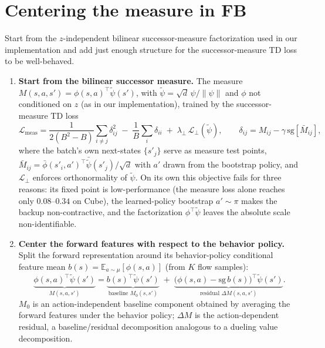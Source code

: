 \documentclass[11pt]{article}
\newcommand{\E}{\mathbb{E}}
\newcommand{\sg}{\mathrm{sg}}
\begin{document}
\section{Centering the measure in FB}
\label{sec:centered}

Start from the $z$-independent bilinear successor-measure factorization used in our implementation and add just enough structure for the successor-measure TD loss to be well-behaved.

\begin{enumerate}
    \item \textbf{Start from the bilinear successor measure.}
    The measure $M(s,a,s')=\phi(s,a)^\top\tilde\psi(s')$, with $\tilde\psi=\sqrt d\,\psi/\|\psi\|$ and $\phi$ not conditioned on $z$ (as in our implementation), trained by the successor-measure TD loss
    \begin{equation}
        \mathcal L_{\mathrm{meas}}
        = \frac{1}{2(B^2{-}B)}\sum_{i\neq j}\delta_{ij}^2 \;-\; \frac1B\sum_i \delta_{ii}
        \;+\; \lambda_\perp\,\mathcal L_\perp(\tilde\psi),
        \qquad
        \delta_{ij} = M_{ij} - \gamma\,\sg[\bar M_{ij}],
        \label{eq:fbloss}
    \end{equation}
    where the batch's own next-states $\{s'_j\}$ serve as measure test points, $\bar M_{ij}=\bar\phi(s'_i,a')^\top\bar{\tilde\psi}(s'_j)/\sqrt d$ with $a'$ drawn from the bootstrap policy, and $\mathcal L_\perp$ enforces orthonormality of $\tilde\psi$.
    On its own this objective fails for three reasons: its fixed point is low-performance (the measure loss alone reaches only $0.08$--$0.34$ on Cube), the learned-policy bootstrap $a'\sim\pi$ makes the backup non-contractive, and the factorization $\phi^\top\tilde\psi$ leaves the absolute scale non-identifiable.

    \item \textbf{Center the forward features with respect to the behavior policy.}
    Split the forward representation around its behavior-policy conditional feature mean $b(s)=\E_{a\sim\mu}[\phi(s,a)]$ (from $K$ flow samples):
    \begin{equation}
        \underbrace{\phi(s,a)^\top\tilde\psi(s')}_{M(s,a,s')} =\underbrace{b(s)^\top\tilde\psi(s')}_{\text{baseline }M_0(s,s')} \;+\;\underbrace{\big(\phi(s,a)-\sg\,b(s)\big)^\top\tilde\psi(s')}_{\text{residual }\Delta M(s,a,s')}.
    \end{equation}
    $M_0$ is an action-independent baseline component obtained by averaging the forward features under the behavior policy; $\Delta M$ is the action-dependent residual, a baseline/residual decomposition analogous to a dueling value decomposition.


\end{enumerate}
\end{document}
